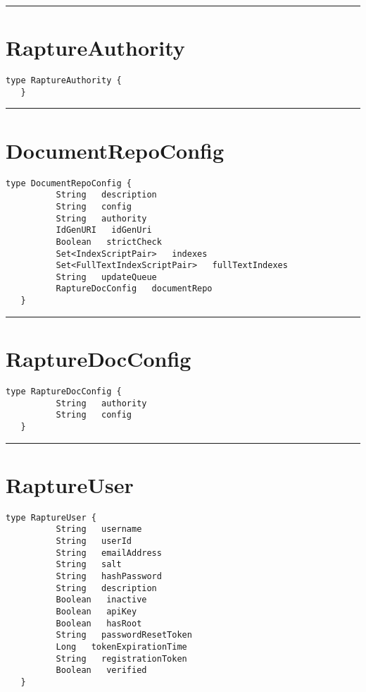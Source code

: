 \rule{12cm}{2pt}
\section{RaptureAuthority}
\label{type:RaptureAuthority}

\begin{lstlisting}[style=nonumbers]
   type RaptureAuthority {
   }
\end{lstlisting}

\rule{12cm}{2pt}
\section{DocumentRepoConfig}
\label{type:DocumentRepoConfig}

\begin{lstlisting}[style=nonumbers]
   type DocumentRepoConfig {
          String   description
          String   config
          String   authority
          IdGenURI   idGenUri
          Boolean   strictCheck
          Set<IndexScriptPair>   indexes
          Set<FullTextIndexScriptPair>   fullTextIndexes
          String   updateQueue
          RaptureDocConfig   documentRepo
   }
\end{lstlisting}

\rule{12cm}{2pt}
\section{RaptureDocConfig}
\label{type:RaptureDocConfig}

\begin{lstlisting}[style=nonumbers]
   type RaptureDocConfig {
          String   authority
          String   config
   }
\end{lstlisting}

\rule{12cm}{2pt}
\section{RaptureUser}
\label{type:RaptureUser}

\begin{lstlisting}[style=nonumbers]
   type RaptureUser {
          String   username
          String   userId
          String   emailAddress
          String   salt
          String   hashPassword
          String   description
          Boolean   inactive
          Boolean   apiKey
          Boolean   hasRoot
          String   passwordResetToken
          Long   tokenExpirationTime
          String   registrationToken
          Boolean   verified
   }
\end{lstlisting}

